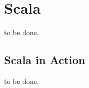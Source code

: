 \section{Scala}
\label{abs:einleitung_echt}
to be done.


\subsection{Scala in Action}
\label{abs:Scala in Action}
to be done.

\begin{comment}
\begin{figure}[h]
  \centering
  \caption{Reihungszugriff für Array A}
  \label{fig:1}
\end{figure}
\end{comment}

